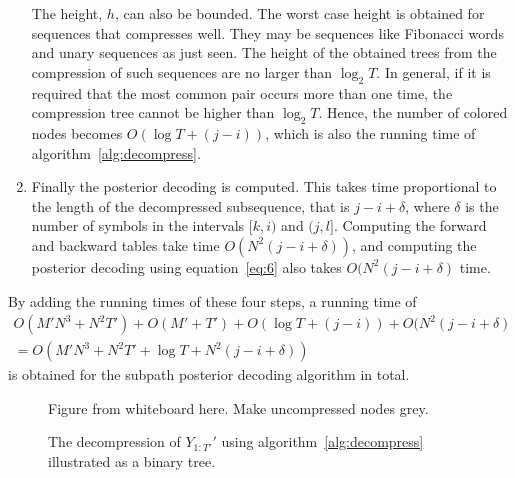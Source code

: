 \begin{enumerate}
  The height, $h$, can also be bounded. The worst case height is obtained for
  sequences that compresses well. They may be sequences like Fibonacci words
  and unary sequences as just seen. The height of the obtained trees from the
  compression of such sequences are no larger than $\log_2 T$. In general, if
  it is required that the most common pair occurs more than one time, the
  compression tree cannot be higher than $\log_2 T$. Hence, the number of
  colored nodes becomes $O(\log T + (j - i))$, which is also the running time
  of algorithm~\ref{alg:decompress}.

\item Finally the posterior decoding is computed. This takes time proportional
  to the length of the decompressed subsequence, that is $j - i + \delta$,
  where $\delta$ is the number of symbols in the intervals $[k, i)$ and
  $(j, l]$. Computing the forward and backward tables take time
  $O(N^2 (j - i + \delta))$, and computing the posterior decoding using
  equation~\eqref{eq:6} also takes $O(N^2 (j - i + \delta)$ time.
\end{enumerate}
By adding the running times of these four steps, a running time of
\begin{gather*}
    O(M' N^3 + N^2 T') + O(M' + T') + O(\log T + (j - i)) + O(N^2 (j - i +
    \delta) \\
    = O(M' N^3 + N^2 T' + \log T + N^2 (j - i + \delta))
\end{gather*}
is obtained for the subpath posterior decoding algorithm in total.

\begin{figure}
  \centering
  Figure from whiteboard here. Make uncompressed nodes grey.
  \caption{The decompression of $Y_{1:T'}'$ using
    algorithm~\ref{alg:decompress} illustrated as a binary tree.}
  \label{fig:decompression}
\end{figure}


